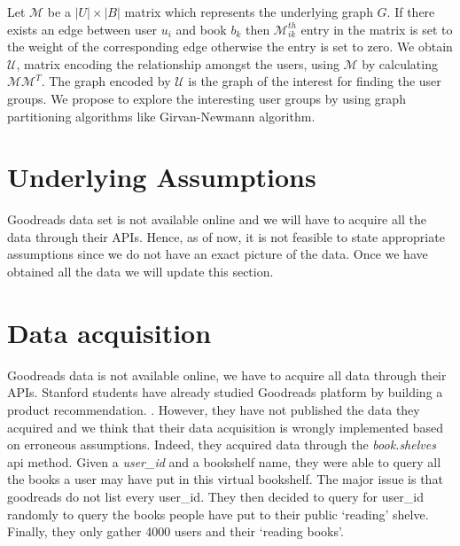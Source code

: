 \documentclass[11pt]{article}
\begin{document}
Let $\mathcal{M}$ be a $|U| \times |B|$ matrix which represents the underlying graph $G$. If there exists an edge between user $u_i$ and book $b_k$ then $\mathcal{M}_{ik}^{th}$ entry in the matrix is set to the weight of the corresponding edge otherwise the entry is set to zero. We obtain $\mathcal{U}$, matrix encoding the relationship amongst the users, using $\mathcal{M}$ by calculating $\mathcal{M}\mathcal{M}^{T}$. The graph encoded by $\mathcal{U}$ is the graph of the interest for finding the user groups. We propose to explore the interesting user groups by using graph partitioning algorithms like Girvan-Newmann algorithm.


\section{Underlying Assumptions}

Goodreads data set is not available online and  we will have to acquire all the data through their APIs. Hence, as of now, it is not feasible to state appropriate assumptions since we do not have an exact picture of the data. Once we have obtained all the data we will update this section.

\section{Data acquisition}

Goodreads data is not available online, we have to acquire all data through their APIs. Stanford students have already studied Goodreads platform by building a product recommendation. \cite{stanford:goodreads}. However, they have not published the data they acquired and we think that their data acquisition is wrongly implemented based on erroneous assumptions. Indeed, they acquired data through the \textit{book.shelves} api method. Given a \textit{user\_id} and a bookshelf name, they were able to query all the books a user may have put in this virtual bookshelf. The major issue is that goodreads do not list every user\_id. They then decided to query for user\_id randomly to query the books people have put to their public `reading' shelve. Finally, they only gather 4000 users and their `reading books'.
\end{document}
